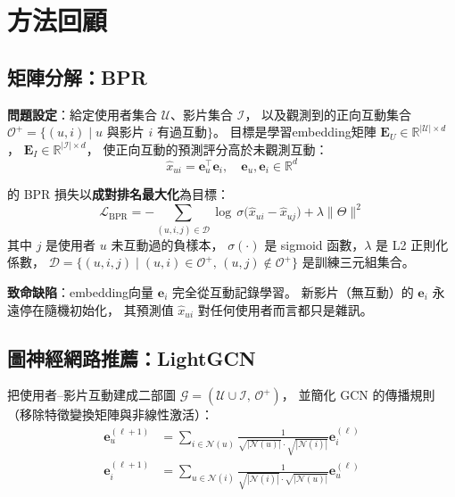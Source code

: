 \documentclass[12pt, a4paper]{article}
\begin{document}
\section{方法回顧}
\label{sec:related}

\subsection{矩陣分解：BPR}

\textbf{問題設定}：給定使用者集合 $\mathcal{U}$、影片集合 $\mathcal{I}$，
以及觀測到的正向互動集合
$\mathcal{O}^+ = \{(u,i) \mid u \text{ 與影片 } i \text{ 有過互動}\}$。
目標是學習embedding矩陣
$\mathbf{E}_U \in \mathbb{R}^{|\mathcal{U}| \times d}$，
$\mathbf{E}_I \in \mathbb{R}^{|\mathcal{I}| \times d}$，
使正向互動的預測評分高於未觀測互動：
\begin{equation}
  \hat{x}_{ui} = \mathbf{e}_u^\top \mathbf{e}_i,
  \quad \mathbf{e}_u, \mathbf{e}_i \in \mathbb{R}^d
\end{equation}

\citet{rendle2009bpr} 的 BPR 損失以\textbf{成對排名最大化}為目標：
\begin{equation}
  \mathcal{L}_{\mathrm{BPR}} =
  -\sum_{(u,i,j)\in\mathcal{D}}
    \log\,\sigma\!\bigl(\hat{x}_{ui} - \hat{x}_{uj}\bigr)
  + \lambda\|\Theta\|^2
  \label{eq:bpr}
\end{equation}
其中 $j$ 是使用者 $u$ 未互動過的負樣本，
$\sigma(\cdot)$ 是 sigmoid 函數，$\lambda$ 是 L2 正則化係數，
$\mathcal{D} = \{(u,i,j) \mid (u,i)\in\mathcal{O}^+,\, (u,j)\notin\mathcal{O}^+\}$
是訓練三元組集合。

\textbf{致命缺陷}：embedding向量 $\mathbf{e}_i$ 完全從互動記錄學習。
新影片（無互動）的 $\mathbf{e}_i$ 永遠停在隨機初始化，
其預測值 $\hat{x}_{ui}$ 對任何使用者而言都只是雜訊。

\subsection{圖神經網路推薦：LightGCN}

\citet{he2020lightgcn} 把使用者–影片互動建成二部圖
$\mathcal{G} = (\mathcal{U}\cup\mathcal{I},\,\mathcal{O}^+)$，
並簡化 GCN 的傳播規則（移除特徵變換矩陣與非線性激活）：
\begin{align}
  \mathbf{e}_u^{(\ell+1)} &=
    \sum_{i\in\mathcal{N}(u)}
      \frac{1}{\sqrt{|\mathcal{N}(u)|}\cdot\sqrt{|\mathcal{N}(i)|}}
      \mathbf{e}_i^{(\ell)}
  \label{eq:lightgcn_u}\\
  \mathbf{e}_i^{(\ell+1)} &=
    \sum_{u\in\mathcal{N}(i)}
      \frac{1}{\sqrt{|\mathcal{N}(i)|}\cdot\sqrt{|\mathcal{N}(u)|}}
      \mathbf{e}_u^{(\ell)}
  \label{eq:lightgcn_i}
\end{align}
\end{document}
